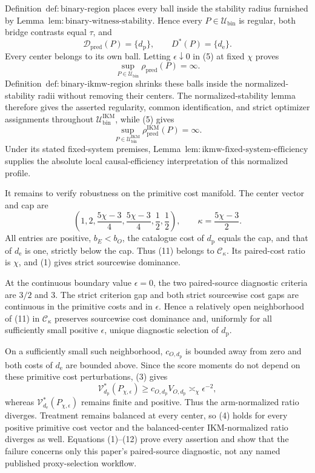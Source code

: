Definition~\(\mathrm{def{:}binary\text{-}region}\) places every ball inside the stability radius furnished by Lemma~\(\mathrm{lem{:}binary\text{-}witness\text{-}stability}\).  Hence every \(P\in\mathcal U_{\mathrm{bin}}\) is regular, both bridge contrasts equal \(\tau\), and
\[
 \mathcal D_{\mathrm{pred}}(P)=\{d_{\mathrm p}\},
 \qquad
 D^*(P)=\{d_{\mathrm e}\}.                             \tag{8}
\]
Every center belongs to its own ball.  Letting \(\epsilon\downarrow0\) in (5) at fixed \(\chi\) proves
\[
 \sup_{P\in\mathcal U_{\mathrm{bin}}}\rho_{\mathrm{pred}}(P)=\infty. \tag{9}
\]
Definition~\(\mathrm{def{:}binary\text{-}ikmw\text{-}region}\) shrinks these balls inside the normalized-stability radii without removing their centers.  The normalized-stability lemma therefore gives the asserted regularity, common identification, and strict optimizer assignments throughout \(\mathcal U_{\mathrm{bin}}^{\mathrm{IKM}}\), while (5) gives
\[
 \sup_{P\in\mathcal U_{\mathrm{bin}}^{\mathrm{IKM}}}
 \rho_{\mathrm{pred}}^{\mathrm{IKM}}(P)=\infty.         \tag{10}
\]
Under its stated fixed-system premises, Lemma~\(\mathrm{lem{:}ikmw\text{-}fixed\text{-}system\text{-}efficiency}\) supplies the absolute local causal-efficiency interpretation of this normalized profile.

It remains to verify robustness on the primitive cost manifold.  The center vector and cap are
\[
 \left(1,2,\frac{5\chi-3}{4},\frac{5\chi-3}{4},
 \frac12,\frac12\right),
 \qquad
 \kappa=\frac{5\chi-3}{2}.                              \tag{11}
\]
All entries are positive, \(b_E<b_O\), the catalogue cost of \(d_{\mathrm p}\) equals the cap, and that of \(d_{\mathrm e}\) is one, strictly below the cap.  Thus (11) belongs to \(\mathcal C_\kappa\).  Its paired-cost ratio is \(\chi\), and (1) gives strict sourcewise dominance.

At the continuous boundary value \(\epsilon=0\), the two paired-source diagnostic criteria are \(3/2\) and \(3\).  The strict criterion gap and both strict sourcewise cost gaps are continuous in the primitive costs and in \(\epsilon\).  Hence a relatively open neighborhood of (11) in \(\mathcal C_\kappa\) preserves sourcewise cost dominance and, uniformly for all sufficiently small positive \(\epsilon\), unique diagnostic selection of \(d_{\mathrm p}\).

On a sufficiently small such neighborhood, \(c_{O,d_{\mathrm p}}\) is bounded away from zero and both costs of \(d_{\mathrm e}\) are bounded above.  Since the score moments do not depend on these primitive cost perturbations, (3) gives
\[
 \mathcal V_{d_{\mathrm p}}^*(P_{\chi,\epsilon})
 \ge c_{O,d_{\mathrm p}}V_{O,d_{\mathrm p}}
 \asymp_\chi\epsilon^{-2},                              \tag{12}
\]
whereas \(\mathcal V_{d_{\mathrm e}}^*(P_{\chi,\epsilon})\) remains finite and positive.  Thus the arm-normalized ratio diverges.  Treatment remains balanced at every center, so (4) holds for every positive primitive cost vector and the balanced-center IKM-normalized ratio diverges as well.  Equations (1)--(12) prove every assertion and show that the failure concerns only this paper's paired-source diagnostic, not any named published proxy-selection workflow.